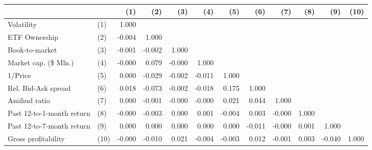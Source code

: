 \begin{tabular}{llrrrrrrrrrr}
\toprule
                    &  & (1) & (2) &  (3) & (4) & (5) & (6) & (7) & (8) & (9) & (10)\\
\midrule
Volatility & (1) &  1.000 &        &        &        &        &        &        &       &        &       \\
ETF Ownership & (2) & -0.004 &  1.000 &        &        &        &        &        &       &        &       \\
Book-to-market & (3) & -0.001 & -0.002 &  1.000 &        &        &        &        &       &        &       \\
Market cap. (\$ Mln.) & (4) & -0.000 &  0.079 & -0.000 &  1.000 &        &        &        &       &        &       \\
1/Price & (5) &  0.000 & -0.029 & -0.002 & -0.011 &  1.000 &        &        &       &        &       \\
Rel. Bid-Ask spread & (6) &  0.018 & -0.073 & -0.002 & -0.018 &  0.175 &  1.000 &        &       &        &       \\
Amihud ratio & (7) &  0.000 & -0.001 & -0.000 & -0.000 &  0.021 &  0.044 &  1.000 &       &        &       \\
Past 12-to-1-month return & (8) & -0.000 & -0.003 &  0.000 &  0.001 & -0.004 &  0.003 & -0.000 & 1.000 &        &       \\
Past 12-to-7-month return & (9) &  0.000 &  0.000 &  0.000 &  0.000 &  0.000 & -0.011 & -0.000 & 0.001 &  1.000 &       \\
Gross profitability & (10) & -0.000 & -0.010 &  0.021 & -0.004 & -0.003 &  0.012 & -0.001 & 0.003 & -0.040 & 1.000 \\
\bottomrule
\end{tabular}
